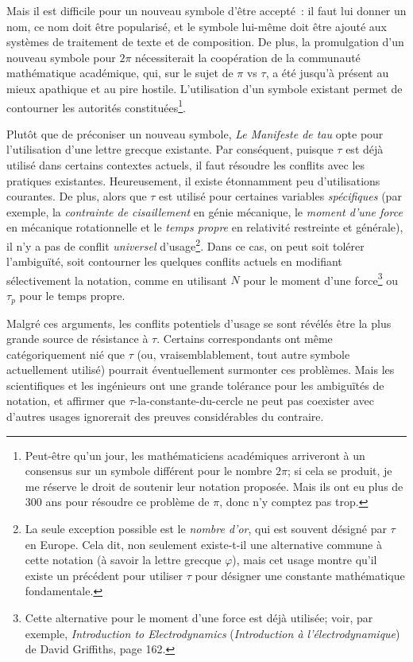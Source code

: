 Mais il est difficile pour un nouveau symbole d'être accepté~: il faut lui
donner un nom, ce nom doit être popularisé, et le symbole lui-même doit être
ajouté aux systèmes de traitement de texte et de composition. De plus, la
promulgation d'un nouveau symbole pour $2\pi$ nécessiterait la coopération de la
communauté mathématique académique, qui, sur le sujet de $\pi$ vs $\tau$, a été
jusqu'à présent au mieux apathique et au pire hostile. L'utilisation d'un
symbole existant permet de contourner les autorités
constituées\ns\footnote{Peut-être qu'un jour, les mathématiciens académiques
arriveront à un consensus sur un symbole différent pour le nombre $2\pi$\ns; si
cela se produit, je me réserve le droit de soutenir leur notation proposée. Mais
ils ont eu plus de 300 ans pour résoudre ce problème de $\pi$, donc n'y comptez
pas trop.}.

Plutôt que de préconiser un nouveau symbole, \emph{Le Manifeste de tau} opte
pour l'utilisation d'une lettre grecque existante. Par conséquent, puisque
$\tau$ est déjà utilisé dans certains contextes actuels, il faut résoudre les
conflits avec les pratiques existantes. Heureusement, il existe étonnamment peu
d'utilisations courantes. De plus, alors que $\tau$ est utilisé pour certaines
variables \emph{spécifiques} (par exemple, la \emph{contrainte de cisaillement}
en génie mécanique, le \emph{moment d'une force} en mécanique rotationnelle et
le \emph{temps propre} en relativité restreinte et générale), il n'y a pas
de conflit \emph{universel} d'usage\ns\footnote{La seule exception
possible est le \emph{nombre d'or}, qui est souvent désigné par $\tau$ en
Europe. Cela dit, non seulement existe-t-il une alternative commune à cette notation
(à savoir la lettre grecque $\varphi$), mais cet usage montre qu'il existe
un précédent pour utiliser $\tau$ pour désigner une constante mathématique
fondamentale.}. Dans ce cas, on peut soit tolérer l'ambiguïté, soit contourner
les quelques conflits actuels en modifiant sélectivement la notation, comme en
utilisant $N$ pour le moment d'une force\ns\footnote{Cette alternative pour le
moment d'une force est déjà utilisée\ns; voir, par exemple, \emph{Introduction to
Electrodynamics} (\emph{Introduction à l'électrodynamique}) de David Griffiths,
page 162.} ou $\tau_p$ pour le temps propre.

Malgré ces arguments, les conflits potentiels d'usage se sont révélés être
la plus grande source de résistance à $\tau$. Certains correspondants ont même
catégoriquement nié que $\tau$ (ou, vraisemblablement, tout autre symbole
actuellement utilisé) pourrait éventuellement surmonter ces problèmes. Mais les
scientifiques et les ingénieurs ont une grande tolérance pour les ambiguïtés de
notation, et affirmer que $\tau$-la-constante-du-cercle ne peut pas coexister
avec d'autres usages ignorerait des preuves considérables du contraire.

